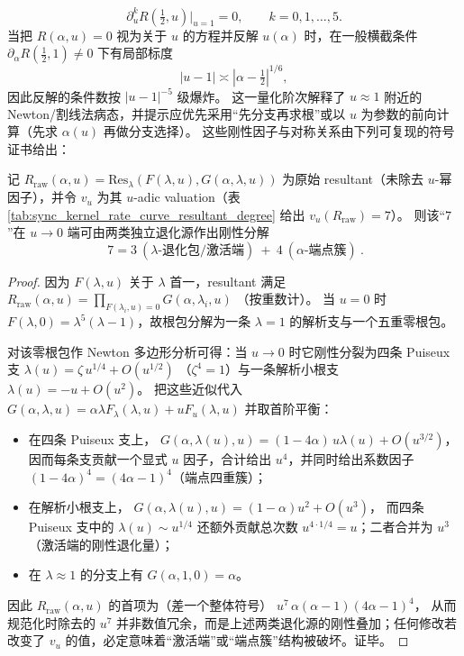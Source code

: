 \begin{remark}[消元曲线的对偶对称、端点奇异簇与 \texorpdfstring{$\alpha=\tfrac12$}{alpha=1/2} 聚合指纹]
\[
\partial_u^k R\!\left(\tfrac12,u\right)\Big|_{u=1}=0,\qquad k=0,1,\dots,5.
\]
当把 \(R(\alpha,u)=0\) 视为关于 \(u\) 的方程并反解 \(u(\alpha)\) 时，在一般横截条件 \(\partial_\alpha R(\tfrac12,1)\neq0\) 下有局部标度
\[
|u-1|\asymp|\alpha-\tfrac12|^{1/6},
\]
因此反解的条件数按 \(|u-1|^{-5}\) 级爆炸。
这一量化阶次解释了 \(u\approx1\) 附近的 Newton/割线法病态，并提示应优先采用“先分支再求根”或以 \(u\) 为参数的前向计算（先求 \(\alpha(u)\) 再做分支选择）。
这些刚性因子与对称关系由下列可复现的符号证书给出：

\end{remark}


\begin{proposition}[\texorpdfstring{$v_u(R_{\mathrm{raw}})=7$}{vu=7} 的刚性分解：\texorpdfstring{$7=3+4$}{7=3+4}]\label{prop:rate-resultant-uadic-split-7}
记 \(R_{\mathrm{raw}}(\alpha,u)=\mathrm{Res}_\lambda(F(\lambda,u),G(\alpha,\lambda,u))\) 为原始 resultant（未除去 \(u\)-幂因子），并令 \(v_u\) 为其 \(u\)-adic valuation（表 \ref{tab:sync_kernel_rate_curve_resultant_degree} 给出 \(v_u(R_{\mathrm{raw}})=7\)）。
则该“\(7\)”在 \(u\to 0\) 端可由两类独立退化源作出刚性分解
\[
\boxed{\ 7=3\ (\lambda\text{-退化包/激活端})\ +\ 4\ (\alpha\text{-端点簇})\ }.
\]
\begin{proof}
因为 \(F(\lambda,u)\) 关于 \(\lambda\) 首一，resultant 满足
\(
R_{\mathrm{raw}}(\alpha,u)=\prod_{F(\lambda_i,u)=0}G(\alpha,\lambda_i,u)
\)
（按重数计）。
当 \(u=0\) 时 \(F(\lambda,0)=\lambda^5(\lambda-1)\)，故根包分解为一条 \(\lambda=1\) 的解析支与一个五重零根包。
\par
\noindent 对该零根包作 Newton 多边形分析可得：当 \(u\to0\) 时它刚性分裂为四条 Puiseux 支
\(
\lambda(u)=\zeta\,u^{1/4}+O(u^{1/2})
\)
（\(\zeta^4=1\)）与一条解析小根支
\(
\lambda(u)=-u+O(u^2)
\)。
把这些近似代入
\(
G(\alpha,\lambda,u)=\alpha\lambda F_\lambda(\lambda,u)+uF_u(\lambda,u)
\)
并取首阶平衡：
\begin{itemize}
  \item 在四条 Puiseux 支上，
  \(
  G(\alpha,\lambda(u),u)=(1-4\alpha)\,u\lambda(u)+O(u^{3/2})
  \)，
  因而每条支贡献一个显式 \(u\) 因子，合计给出 \(u^4\)，并同时给出系数因子 \((1-4\alpha)^4=(4\alpha-1)^4\)（端点四重簇）；
  \item 在解析小根支上，
  \(
  G(\alpha,\lambda(u),u)=(1-\alpha)u^2+O(u^3)
  \)，
  而四条 Puiseux 支中的 \(\lambda(u)\sim u^{1/4}\) 还额外贡献总次数 \(u^{4\cdot 1/4}=u\)；二者合并为 \(u^3\)（激活端的刚性退化量）；
  \item 在 \(\lambda\approx 1\) 的分支上有 \(G(\alpha,1,0)=\alpha\)。
\end{itemize}
因此 \(R_{\mathrm{raw}}(\alpha,u)\) 的首项为（差一个整体符号）
\(
u^7\,\alpha(\alpha-1)(4\alpha-1)^4
\)，
从而规范化时除去的 \(u^7\) 并非数值冗余，而是上述两类退化源的刚性叠加；任何修改若改变了 \(v_u\) 的值，必定意味着“激活端”或“端点簇”结构被破坏。证毕。
\end{proof}
\end{proposition}

